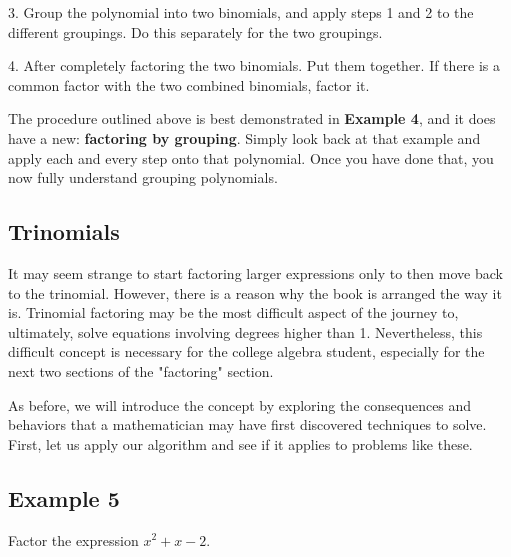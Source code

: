     3.  Group the polynomial into two binomials, and apply steps 1 and 2 to the different
    groupings. Do this separately for the two groupings.

    4.  After completely factoring the two binomials. Put them together. If there is a
    common factor with the two combined binomials, factor it.



The procedure outlined above is best demonstrated in \textbf{Example 4}, and it does have
a new: \textbf{factoring by grouping}. Simply look back at that example and apply each and
every step onto that polynomial. Once you have done that, you now fully understand
grouping polynomials.




\subsection{Trinomials}
\label{sss:trin-c323}




It may seem strange to start factoring larger expressions only to then move back to the
trinomial. However, there is a reason why the book is arranged the way it is. Trinomial
factoring may be the most difficult aspect of the journey to, ultimately, solve equations
involving degrees higher than 1. Nevertheless, this difficult concept is necessary for the
college algebra student, especially for the next two sections of the "factoring" section.



As before, we will introduce the concept by exploring the consequences and behaviors that
a mathematician may have first discovered techniques to solve. First, let us apply our
algorithm and see if it applies to problems like these.




\subsection{Example 5}
\label{sss:exam-cc01}




Factor the expression $x^{2}+x-2$.



